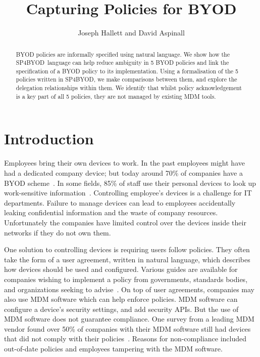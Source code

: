 \documentclass{llncs}
\title{Capturing Policies for BYOD}
\author{Joseph Hallett and David Aspinall}
\institute{School of Informatics, University of Edinburgh}
\newcommand{\AppPAL}[0]{SP4BYOD}
\begin{document}
\maketitle
\begin{abstract}
  BYOD policies are informally specified using natural language.
  We show how the \AppPAL~language can help reduce ambiguity in 5 BYOD policies and link the specification of a BYOD policy to its implementation.
  Using a formalisation of the 5 policies written in \AppPAL, we make comparisons between them, and explore the delegation relationships within them.
  We identify that whilst policy acknowledgement is a key part of all 5 policies, they are not managed by existing MDM tools.
\end{abstract}
\section{Introduction}
\label{sec:intro}

Employees bring their own devices to work.
In the past employees might have had a dedicated company device; 
  but today around 70\% of companies have a BYOD scheme~\cite{schulze_byod_2016}. 
In some fields, 85\% of staff use their personal devices to look up work-sensitive information~\cite{patel_uk_2015}.
Controlling employee's devices is a challenge for IT departments.
Failure to manage devices can lead to employees accidentally leaking confidential information and the waste of company resources.
Unfortunately the companies have limited control over the devices inside their networks if they do not own them.

One solution to controlling devices is requiring users follow policies.
They often take the form of a user agreement, written in natural language, which describes how devices should be used and configured.
Various guides are available for companies wishing to implement a policy from governments, standards bodies, and organizations seeking to advise~\cite{nicholas_r._c._guerin_security_2008,souppaya_guidelines_????,cesg_byod_2015}.
On top of user agreements, companies may also use \ac{MDM} software which can help enforce policies.
\ac{MDM} software can configure a device's security settings, and add security APIs.
But the use of \ac{MDM} software does not guarantee compliance.
One survey from a leading MDM vendor found over 50\% of companies with their \ac{MDM} software still had devices that did not comply with their policies~\cite{mobileiron_security_labs_q4_2015}.
Reasons for non-compliance included out-of-date policies and employees tampering with the \ac{MDM} software.
\end{document}
